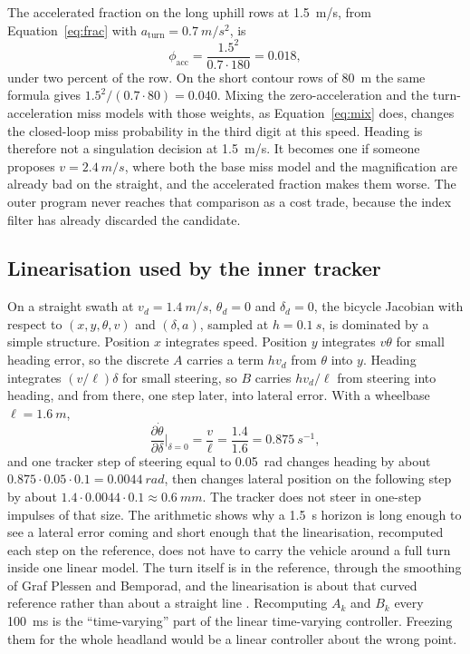 The accelerated fraction on the long uphill rows at \SI{1.5}{m/s}, from Equation~\eqref{eq:frac} with \(a_{\mathrm{turn}}=\SI{0.7}{m/s^2}\), is
\begin{equation}
\label{eq:phi}
\phi_{\mathrm{acc}} = \frac{1.5^2}{0.7\cdot 180} = 0.018,
\end{equation}
under two percent of the row. On the short contour rows of \SI{80}{m} the same formula gives \(1.5^2/(0.7\cdot 80)=0.040\). Mixing the zero-acceleration and the turn-acceleration miss models with those weights, as Equation~\eqref{eq:mix} does, changes the closed-loop miss probability in the third digit at this speed. Heading is therefore not a singulation decision at \SI{1.5}{m/s}. It becomes one if someone proposes \(v=\SI{2.4}{m/s}\), where both the base miss model and the magnification are already bad on the straight, and the accelerated fraction makes them worse. The outer program never reaches that comparison as a cost trade, because the index filter has already discarded the candidate.

\subsection{Linearisation used by the inner tracker}

On a straight swath at \(v_d=\SI{1.4}{m/s}\), \(\theta_d=0\) and \(\delta_d=0\), the bicycle Jacobian with respect to \((x,y,\theta,v)\) and \((\delta, a)\), sampled at \(h=\SI{0.1}{s}\), is dominated by a simple structure. Position \(x\) integrates speed. Position \(y\) integrates \(v\theta\) for small heading error, so the discrete \(A\) carries a term \(h v_d\) from \(\theta\) into \(y\). Heading integrates \((v/\ell)\delta\) for small steering, so \(B\) carries \(h v_d/\ell\) from steering into heading, and from there, one step later, into lateral error. With a wheelbase \(\ell=\SI{1.6}{m}\),
\begin{equation}
\label{eq:jac}
\frac{\partial \dot{\theta}}{\partial \delta}\bigg|_{\delta=0} = \frac{v}{\ell} = \frac{1.4}{1.6} = \SI{0.875}{s^{-1}},
\end{equation}
and one tracker step of steering equal to \SI{0.05}{rad} changes heading by about \(0.875\cdot 0.05\cdot 0.1=\SI{0.0044}{rad}\), then changes lateral position on the following step by about \(1.4\cdot 0.0044\cdot 0.1\approx\SI{0.6}{mm}\). The tracker does not steer in one-step impulses of that size. The arithmetic shows why a \SI{1.5}{s} horizon is long enough to see a lateral error coming and short enough that the linearisation, recomputed each step on the reference, does not have to carry the vehicle around a full turn inside one linear model. The turn itself is in the reference, through the smoothing of Graf Plessen and Bemporad, and the linearisation is about that curved reference rather than about a straight line \cite{plessen2017}. Recomputing \(A_k\) and \(B_k\) every \SI{100}{ms} is the ``time-varying'' part of the linear time-varying controller. Freezing them for the whole headland would be a linear controller about the wrong point.


